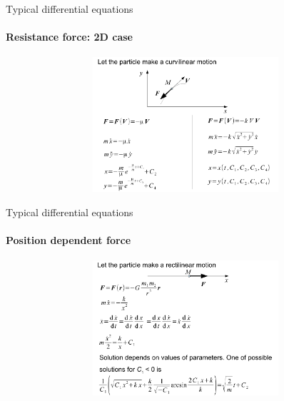 \documentclass[aspectratio=169]{beamer}
\begin{document}
\begin{frame}[t]{Typical differential equations}
    \framesubtitle{Resistance force: 2D case}
    \vspace*{-0.6cm}
    \begin{center}
        \begin{figure}[H]
            \centering\includegraphics[height=5cm,width=1\textwidth,keepaspectratio]{image6.png}
            \label{fig:image6}
        \end{figure}
    \end{center}
\end{frame}

\begin{frame}[t]{Typical differential equations}
    \framesubtitle{Position dependent force}
    \vspace*{-0.6cm}
    \begin{center}
        \begin{figure}[H]
            \centering\includegraphics[height=5cm,width=1\textwidth,keepaspectratio]{image16.png}
            \label{fig:image16}
        \end{figure}
    \end{center}
\end{frame}
\end{document}

